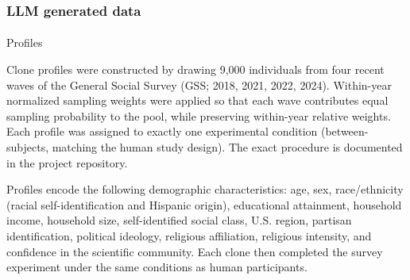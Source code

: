 \documentclass[
  letterpaper,
  DIV=11,
  numbers=noendperiod]{scrartcl}
\makeatletter
\let\oldparagraph\paragraph
\renewcommand{\paragraph}{
    \@ifstar
      \xxxParagraphStar
      \xxxParagraphNoStar
  }
\newcommand{\xxxParagraphStar}[1]{\oldparagraph*{#1}\mbox{}}
\newcommand{\xxxParagraphNoStar}[1]{\oldparagraph{#1}\mbox{}}
\makeatother
\begin{document}
\subsubsection{LLM generated data}\label{llm-generated-data}

\paragraph{Profiles}\label{profiles}

Clone profiles were constructed by drawing 9,000 individuals from four
recent waves of the General Social Survey (GSS; 2018, 2021, 2022, 2024).
Within-year normalized sampling weights were applied so that each wave
contributes equal sampling probability to the pool, while preserving
within-year relative weights. Each profile was assigned to exactly one
experimental condition (between-subjects, matching the human study
design). The exact procedure is documented in the project repository.

Profiles encode the following demographic characteristics: age, sex,
race/ethnicity (racial self-identification and Hispanic origin),
educational attainment, household income, household size,
self-identified social class, U.S. region, partisan identification,
political ideology, religious affiliation, religious intensity, and
confidence in the scientific community. Each clone then completed the
survey experiment under the same conditions as human participants.
\end{document}
